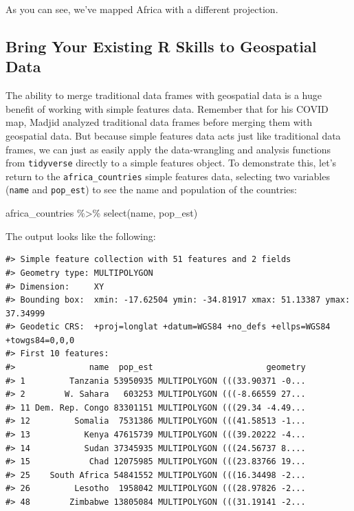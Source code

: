 \documentclass[
]{book}
\newenvironment{Shaded}{\begin{snugshade}}{\end{snugshade}}
\newcommand{\FunctionTok}[1]{\textcolor[rgb]{0.00,0.00,0.00}{#1}}
\newcommand{\NormalTok}[1]{#1}
\newcommand{\SpecialCharTok}[1]{\textcolor[rgb]{0.00,0.00,0.00}{#1}}
\begin{document}
As you can see, we've mapped Africa with a different projection.

\hypertarget{bring-your-existing-r-skills-to-geospatial-data}{%
\subsection*{Bring Your Existing R Skills to Geospatial Data}\label{bring-your-existing-r-skills-to-geospatial-data}}

The ability to merge traditional data frames with geospatial data is a huge benefit of working with simple features data. Remember that for his COVID map, Madjid analyzed traditional data frames before merging them with geospatial data. But because simple features data acts just like traditional data frames, we can just as easily apply the data-wrangling and analysis functions from \texttt{tidyverse} directly to a simple features object. To demonstrate this, let's return to the \texttt{africa\_countries} simple features data, selecting two variables (\texttt{name} and \texttt{pop\_est}) to see the name and population of the countries:

\begin{Shaded}
\begin{Highlighting}[]
\NormalTok{africa\_countries }\SpecialCharTok{\%\textgreater{}\%} 
  \FunctionTok{select}\NormalTok{(name, pop\_est)}
\end{Highlighting}
\end{Shaded}

The output looks like the following:

\begin{verbatim}
#> Simple feature collection with 51 features and 2 fields
#> Geometry type: MULTIPOLYGON
#> Dimension:     XY
#> Bounding box:  xmin: -17.62504 ymin: -34.81917 xmax: 51.13387 ymax: 37.34999
#> Geodetic CRS:  +proj=longlat +datum=WGS84 +no_defs +ellps=WGS84 +towgs84=0,0,0
#> First 10 features:
#>               name  pop_est                       geometry
#> 1         Tanzania 53950935 MULTIPOLYGON (((33.90371 -0...
#> 2        W. Sahara   603253 MULTIPOLYGON (((-8.66559 27...
#> 11 Dem. Rep. Congo 83301151 MULTIPOLYGON (((29.34 -4.49...
#> 12         Somalia  7531386 MULTIPOLYGON (((41.58513 -1...
#> 13           Kenya 47615739 MULTIPOLYGON (((39.20222 -4...
#> 14           Sudan 37345935 MULTIPOLYGON (((24.56737 8....
#> 15            Chad 12075985 MULTIPOLYGON (((23.83766 19...
#> 25    South Africa 54841552 MULTIPOLYGON (((16.34498 -2...
#> 26         Lesotho  1958042 MULTIPOLYGON (((28.97826 -2...
#> 48        Zimbabwe 13805084 MULTIPOLYGON (((31.19141 -2...
\end{verbatim}
\end{document}
